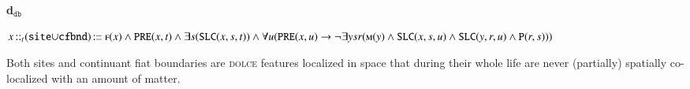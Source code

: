 \documentclass[ao]{iosart2x}
\newcommand{\bfoAxLabel}{\textrm{a$_\texttt{b}$}}
\newcommand{\dbDefLabel}{\textrm{d$_\texttt{db}$}}
\newcounter{cntdbdf}
\newcommand{\dbdf}[1]{\refstepcounter{cntdbdf}\begin{small}{\bf \dbDefLabel\thecntdbdf\label{#1}}\end{small}}
\newcommand{\refbfoax}[1]{({\bfoAxLabel}\ref{#1})}
\newcommand{\refdbdf}[1]{({\dbDefLabel}\ref{#1})}
\newcommand{\pr}[1]{\mathtt{#1}}
\newcommand{\cn}[1]{\mathtt{#1}}
\newcommand\textequal{%
 \rule[.08ex]{5pt}{0.35pt}\llap{\rule[.78ex]{5pt}{0.35pt}}}
\newcommand{\sdef}{{\hspace{1.5pt}:\hspace{-2.5pt}\textequal\hspace{3pt}}}
\newcommand{\dolce}{{\textsc{dolce}}}
\newcommand{\bfo}{{\textsc{bfo}}}
\newcommand {\APOdcat} {\textsc{apo}}
\newcommand {\Mdcat} {\textsc{m}}
\newcommand {\ASdcat} {\textsc{as}}
\newcommand {\EDdcat} {\textsc{ed}}
\newcommand {\Fdcat} {\textsc{f}}
\newcommand {\MOBdcat} {\textsc{mob}}
\newcommand {\NPOBdcat} {\textsc{npob}}
\newcommand {\PEDdcat} {\textsc{ped}}
\newcommand {\TPd} {\ensuremath{\pr{tP}}}
\newcommand {\Pd} {\ensuremath{\pr{P}}}
\newcommand {\ATd} {\ensuremath{\pr{AT}}}
\newcommand {\PREd} {\ensuremath{\pr{PRE}}}
\newcommand {\SDd} {\ensuremath{\pr{SD}}}
\newcommand {\Kd} {\ensuremath{\pr{K}}}
\newcommand {\EXDd} {\ensuremath{\pr{EXD}}}
\newcommand {\SLCd} {\ensuremath{\pr{SLC}}}
\newcommand{\idcntbcat}{\cn{idcnt}}
\newcommand{\sdcntbcat}{\cn{sdcnt}}
\newcommand{\mtenbcat}{\cn{mten}}
\newcommand{\sitebcat}{\cn{site}}
\newcommand{\cfbndbcat}{\cn{cfbnd}}
\newcommand{\bfoiof}[1]{{\,::_{#1\:\!}}}
\begin{document}
%
%
%
%
%
%
%

\item[\dbdf{d2b_siteUcfbnd}] $x \bfoiof{t} (\sitebcat{\cup}\cfbndbcat) \sdef \Fdcat(x) \land \PREd(x,t) \land 
\exists s(\SLCd(x,s,t)) \land \\ 
\mbox{}\hfill{}\forall u(\PREd(x,u) \to \neg\exists ysr(\Mdcat(y) \land \SLCd(x,s,u) \land \SLCd(y,r,u) \land \Pd(r,s)))$

\vspace{1pt}
Both sites and continuant fiat boundaries are {\dolce} features localized in space that during their whole life are never (partially) spatially co-localized with an amount of matter.
\end{document}
